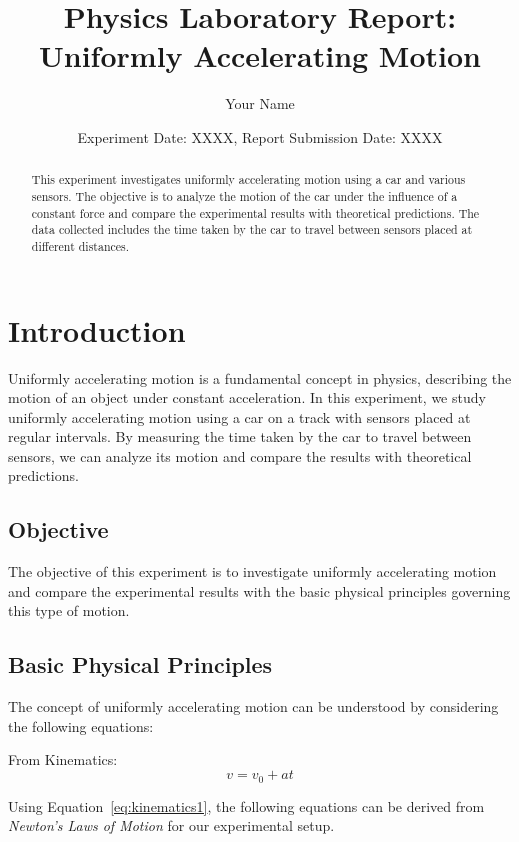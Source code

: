\documentclass[twocolumn]{article}
\begin{document}
\title{\textbf{Physics Laboratory Report: Uniformly Accelerating Motion}}
\author{Your Name}
\date{Experiment Date: XXXX, Report Submission Date: XXXX}
\maketitle

\begin{abstract}
    This experiment investigates uniformly accelerating motion using a car and various sensors. The objective is to analyze the motion of the car under the influence of a constant force and compare the experimental results with theoretical predictions. The data collected includes the time taken by the car to travel between sensors placed at different distances.
\end{abstract}

\section{Introduction}
\label{sec:introduction}
Uniformly accelerating motion is a fundamental concept in physics, describing the motion of an object under constant acceleration. In this experiment, we study uniformly accelerating motion using a car on a track with sensors placed at regular intervals. By measuring the time taken by the car to travel between sensors, we can analyze its motion and compare the results with theoretical predictions.
\subsection{Objective}

The objective of this experiment is to investigate uniformly accelerating motion and compare the experimental results with the basic physical principles governing this type of motion.
\subsection{Basic Physical Principles}

The concept of uniformly accelerating motion can be understood by considering the following equations:

From Kinematics: 
\begin{equation}
v = v_0 + at
\label{eq:kinematics1}
\end{equation}

Using Equation~\ref{eq:kinematics1}, the following equations can be derived from \textit{Newton's Laws of Motion} for our experimental setup.
\end{document}
